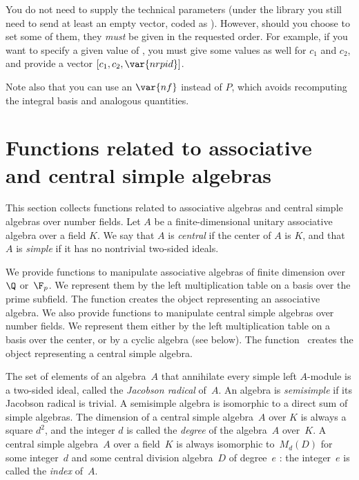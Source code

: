 
You do not need to supply the technical parameters (under the library you
still need to send at least an empty vector, coded as ). However,
should you choose to set some of them, they \emph{must} be given in the
requested order. For example, if you want to specify a given value of
, you must give some values as well for $c_1$ and $c_2$, and provide
a vector $[c_1,c_2,\var{nrpid}]$.

Note also that you can use an $\var{nf}$ instead of $P$, which avoids
recomputing the integral basis and analogous quantities.

\smallskip


\section{Functions related to associative and central simple algebras}

This section collects functions related to associative algebras and central
simple algebras over number fields. Let $A$ be a finite-dimensional unitary
associative algebra over a field $K$. We say that $A$ is \emph{central} if
the center of $A$ is $K$, and that $A$ is \emph{simple} if it has no
nontrivial two-sided ideals.

\par We provide functions to manipulate associative algebras of finite
dimension over~$\Q$ or~$\F_p$. We represent them by the left multiplication
table on a basis over the prime subfield. The function 
creates the object representing an associative algebra. We also provide
functions to manipulate central simple algebras over number fields. We
represent them either by the left multiplication table on a basis over the
center, or by a cyclic algebra (see below). The function~ creates
the object representing a central simple algebra.

\par The set of elements of an algebra~$A$ that annihilate every simple left
$A$-module is a two-sided ideal, called the \emph{Jacobson radical} of~$A$.
An algebra is \emph{semisimple} if its Jacobson radical is trivial. A
semisimple algebra is isomorphic to a direct sum of simple algebras. The
dimension of a central simple algebra~$A$ over $K$ is always a square $d^2$,
and the integer $d$ is called the \emph{degree} of the algebra~$A$ over~$K$.
A central simple algebra~$A$ over a field~$K$ is always isomorphic to~$M_d(D)$
for some integer~$d$ and some central division algebra~$D$ of degree~$e$ : the
integer~$e$ is called the \emph{index} of~$A$.


